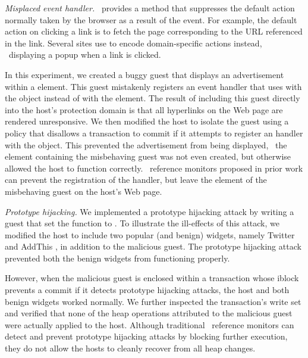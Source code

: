 \begin{mylist}
%
\item \textit{Misplaced event handler.} \js\ provides a 
method that suppresses the default action normally taken by the browser as a
result of the event. For example, the default action on clicking a link is to
fetch the
page corresponding to the URL referenced in the link. Several sites use
 to encode domain-specific actions instead, \eg~displaying
a popup when a link is clicked. 

In this experiment, we created a buggy guest that displays an advertisement
within a  element. This guest mistakenly registers an 
event handler that uses  with the  object
instead of with the  element. The result of including this guest
directly into the host's protection domain is that all hyperlinks on the Web
page are rendered unresponsive.  We then modified the host to isolate the guest
using a policy that disallows a transaction to commit if it attempts to
register an  handler with the  object. This
prevented the advertisement from being displayed, \ie~the  element
containing the misbehaving guest was not even created, but otherwise allowed
the host to function correctly. \js\ reference monitors proposed in prior work
can prevent the registration of the  handler, but leave
the  element of the misbehaving guest on the host's Web page.
%
\item \textit{Prototype hijacking.} We implemented a prototype hijacking attack
by writing a guest that set the  function to
.  To illustrate the ill-effects of this attack, we modified the
host to include two popular (and benign) widgets, namely Twitter \cite{twitter}
and AddThis \cite{addthis}, in addition to the malicious guest. The prototype
hijacking attack prevented both the benign widgets from functioning properly.

However, when the malicious guest is enclosed within a transaction whose iblock
prevents a commit if it detects prototype hijacking attacks, the host and both
benign widgets worked normally. We further inspected the transaction's write
set and verified that none of the heap operations attributed to the malicious
guest were actually applied to the host. Although traditional \js\ reference
monitors can detect and prevent prototype hijacking attacks by blocking further
 execution, they do not allow the hosts to cleanly recover from
all heap changes.


\end{mylist}
